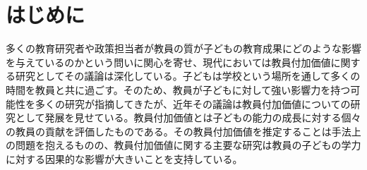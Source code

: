 \documentclass[a4paper,12pt]{article}
\begin{document}
\section{はじめに}
多くの教育研究者や政策担当者が教員の質が子どもの教育成果にどのような影響を与えているのかという問いに関心を寄せ、現代においては教員付加価値に関する研究としてその議論は深化している。子どもは学校という場所を通して多くの時間を教員と共に過ごす。そのため、教員が子どもに対して強い影響力を持つ可能性を多くの研究が指摘してきたが\citep{hanushek1986economics,hanushek2006school, ammermuller2005schooling,hojo2012factors}、近年その議論は教員付加価値についての研究として発展を見せている\cite{kane, chetty, lefgan}。教員付加価値とは子どもの能力の成長に対する個々の教員の貢献を評価したものである。その教員付加価値を推定することは手法上の問題を抱えるものの\citep{jackson2014teacher}、教員付加価値に関する主要な研究は教員の子どもの学力に対する因果的な影響が大きいことを支持している。
\end{document}

